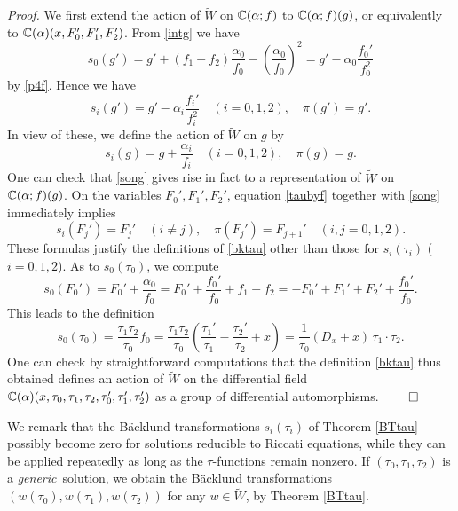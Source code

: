 \medskip\noindent
{\em Proof.} \quad
We first extend the action of $\widetilde{W}$ on ${\Bbb C}(\alpha;f)$ 
to ${\Bbb C}(\alpha;f)(g)$, or equivalently to 
${\Bbb C}(\alpha)(x,F_0',F_1',F'_2)$. 
{}From \eqref{intg} we have 
\begin{equation}
s_0(g')=g' +(f_1-f_2)\frac{\alpha_0}{f_0}-(\frac{\alpha_0}{f_0})^2
=g'-\alpha_0 \frac{f_0'}{f_0^2}
\end{equation}
by \eqref{p4f}. 
Hence we have 
\begin{equation}
s_i(g')=g'-\alpha_i \frac{f_i'}{f_i^2}\quad(i=0,1,2), \quad \pi(g')=g'.
\end{equation}
In view of these, we define the action of $\widetilde{W}$ on $g$ by 
\begin{equation}\label{song}
s_i(g)=g+\frac{\alpha_i}{f_i}\quad (i=0,1,2), \quad \pi(g)=g. 
\end{equation}
One can check that \eqref{song} gives rise in fact to a representation 
of $\widetilde{W}$ on ${\Bbb C}(\alpha;f)(g)$. 
On the variables $F_0', F_1', F_2'$, equation \eqref{taubyf} 
together with \eqref{song} immediately implies 
\begin{equation}
s_i(F_j')=F_j' \quad(i\ne j),\quad \pi(F_j')=F_{j+1}'\quad(i,j=0,1,2). 
\end{equation}  
These formulas justify the definitions of \eqref{bktau} 
other than those for $s_i(\tau_i)$ ($i=0,1,2$). 
As to $s_0(\tau_0)$, we compute 
\begin{equation}
s_0(F_0')=F_0' + \frac{\alpha_0}{f_0}=F_0' + \frac{f_0'}{f_0}+f_1-f_2
=-F_0'+F_1'+F_2'+\frac{f_0'}{f_0}. 
\end{equation}
This leads to the definition
\begin{equation}\label{sandtf}
s_0(\tau_0)=\frac{\tau_1\tau_2}{\tau_0}f_0
=\frac{\tau_1\tau_2}{\tau_0}(\frac{\tau_1'}{\tau_1}-\frac{\tau_2'}{\tau_2}
+x)
=\frac{1}{\tau_0}(D_{x}+x)\,\tau_1\cdot \tau_2. 
\end{equation}
One can check by straightforward computations that 
the definition \eqref{bktau} thus obtained 
defines an action of $\widetilde{W}$ on the differential field
${\Bbb C}(\alpha)(x,\tau_0,\tau_1,\tau_2,\tau_0',\tau_1',\tau_2')$
as a group of differential automorphisms. 
$\qed$
\par\medskip\noindent
We remark that the B\"acklund transformations $s_i(\tau_i)$ 
of Theorem \ref{BTtau} possibly  become zero 
for solutions reducible to Riccati equations, 
while they can be applied repeatedly as long as the $\tau$-functions 
remain nonzero. 
If $(\tau_0,\tau_1,\tau_2)$ is a {\em generic\,} solution, 
we obtain the B\"acklund 
transformations $(w(\tau_0),w(\tau_1),w(\tau_2))$ for 
any $w\in\widetilde{W}$, by Theorem \ref{BTtau}.  


